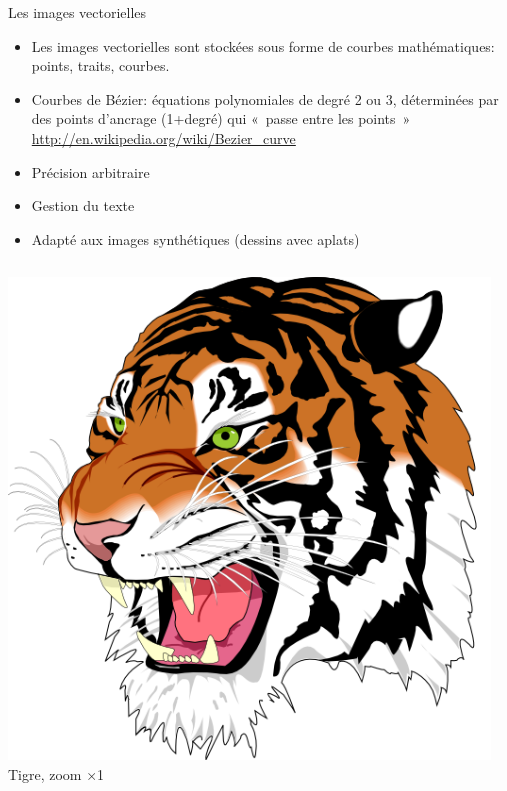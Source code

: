 \begin{frame}[fragile]{Les images vectorielles}
  \begin{itemize}
  \item Les images vectorielles sont stockées sous forme de courbes
    mathématiques: points, traits, courbes.
  \item Courbes de Bézier: équations polynomiales de degré 2 ou 3, déterminées
    par des points d'ancrage (1+degré) qui «~passe entre les points~»
    \url{http://en.wikipedia.org/wiki/Bezier_curve}
  \item Précision arbitraire
  \item Gestion du texte
  \item Adapté aux images synthétiques (dessins avec aplats)
  \end{itemize}
  \begin{columns}
    \begin{column}{.33\linewidth}\centering
      \includegraphics[width=\linewidth]{img/06/tiger512}\\Tigre, zoom ×1
    \end{column}%
    \begin{column}{.33\linewidth}\centering

\end{column}
\end{columns}
\end{frame}
